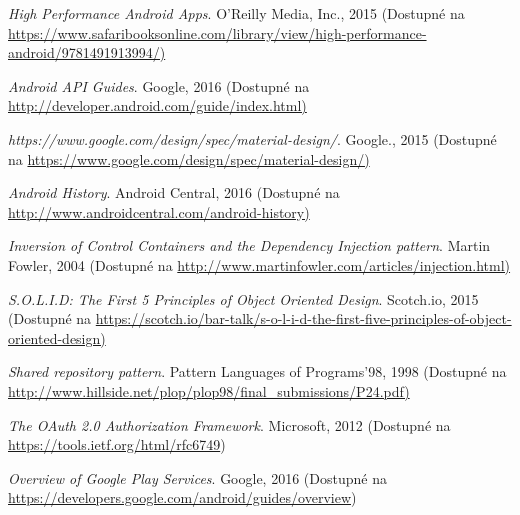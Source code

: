 \documentclass{article}
\begin{document}
\begin{thebibliography}{99}

\textit{High Performance Android Apps}. {O'Reilly Media, Inc., 2015}
\newline(Dostupné na \url{https://www.safaribooksonline.com/library/view/high-performance-android/9781491913994/)}

\textit{Android API Guides}. {Google, 2016}
\newline(Dostupné na \url{http://developer.android.com/guide/index.html)}



\textit{https://www.google.com/design/spec/material-design/}. {Google., 2015}
\newline(Dostupné na \url{https://www.google.com/design/spec/material-design/)}

\textit{Android History}. {Android Central, 2016}
\newline(Dostupné na \url{http://www.androidcentral.com/android-history)}


\textit{Inversion of Control Containers and the Dependency Injection pattern}. {Martin Fowler, 2004}
\newline(Dostupné na \url{http://www.martinfowler.com/articles/injection.html)}


\textit{S.O.L.I.D: The First 5 Principles of Object Oriented Design}. {Scotch.io, 2015}
\newline(Dostupné na \url{https://scotch.io/bar-talk/s-o-l-i-d-the-first-five-principles-of-object-oriented-design)}

\textit{Shared repository pattern}. {Pattern Languages of Programs'98, 1998}
\newline(Dostupné na \url{http://www.hillside.net/plop/plop98/final_submissions/P24.pdf)}

\textit{The OAuth 2.0 Authorization Framework}. {Microsoft, 2012
\newline(Dostupné na \url{https://tools.ietf.org/html/rfc6749})}

\textit{Overview of Google Play Services}. {Google, 2016
\newline(Dostupné na \url{https://developers.google.com/android/guides/overview})}


\end{thebibliography}
\end{document}

